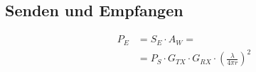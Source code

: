 \subsection{Senden und Empfangen}
\begin{align*}
    P_E & = S_E\cdot A_W =                                                         \\
        & = P_S\cdot G_{TX}\cdot G_{RX}\cdot \left(\frac{\lambda}{4\pi r}\right)^2
\end{align*}
